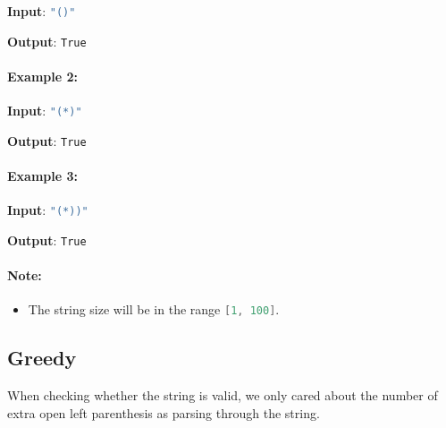 \begin{flushleft}
\textbf{Input}: \lstinline[language=Java, basicstyle=\small\ttfamily, keywordstyle=\bfseries\color{green!40!black}]|"()"|

\textbf{Output}: \lstinline[language=Java, basicstyle=\small\ttfamily, keywordstyle=\bfseries\color{green!40!black}]|True|

\end{flushleft}

\paragraph{Example 2:}

\begin{flushleft}
\textbf{Input}: \lstinline[language=Java, basicstyle=\small\ttfamily, keywordstyle=\bfseries\color{green!40!black}]|"(*)"|

\textbf{Output}: \lstinline[language=Java, basicstyle=\small\ttfamily, keywordstyle=\bfseries\color{green!40!black}]|True|
\end{flushleft}

\paragraph{Example 3:}

\begin{flushleft}
\textbf{Input}: \lstinline[language=Java, basicstyle=\small\ttfamily, keywordstyle=\bfseries\color{green!40!black}]|"(*))"|

\textbf{Output}: \lstinline[language=Java, basicstyle=\small\ttfamily, keywordstyle=\bfseries\color{green!40!black}]|True|
\end{flushleft}

\paragraph{Note:}

\begin{itemize}
\item The string size will be in the range \lstinline[language=Java, basicstyle=\small\ttfamily, keywordstyle=\bfseries\color{green!40!black}]|[1, 100]|.
\end{itemize}


\subsection{Greedy}
When checking whether the string is valid, we only cared about the number of extra open left parenthesis as parsing through the string. 

